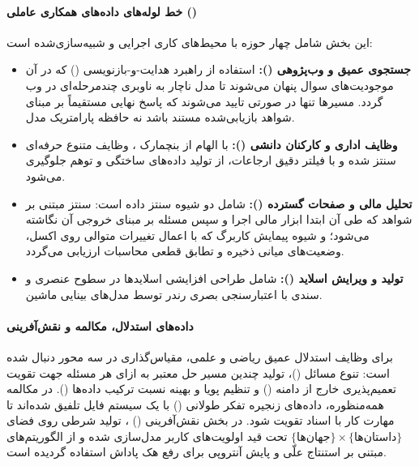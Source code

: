 \paragraph*{خط لوله‌های داده‌های همکاری عاملی ()}
این بخش شامل چهار حوزه با محیط‌های کاری اجرایی و شبیه‌سازی‌شده است:
\begin{itemize}
    \item \textbf{جستجوی عمیق و وب‌پژوهی ():} استفاده از راهبرد هدایت-و-بازنویسی () که در آن موجودیت‌های سوال پنهان می‌شوند تا مدل ناچار به ناوبری چندمرحله‌ای در وب گردد. مسیرها تنها در صورتی تایید می‌شوند که پاسخ نهایی مستقیماً بر مبنای شواهد بازیابی‌شده مستند باشد نه حافظه پارامتریک مدل.
    \item \textbf{وظایف اداری و کارکنان دانشی ():} با الهام از بنچمارک  \cite{patwardhan2025gdpval}، وظایف متنوع حرفه‌ای سنتز شده و با فیلتر دقیق ارجاعات، از تولید داده‌های ساختگی و توهم جلوگیری می‌شود.
    \item \textbf{تحلیل مالی و صفحات گسترده ():} شامل دو شیوه سنتز داده است: سنتز مبتنی بر شواهد \cite{chen2026dive} که طی آن ابتدا ابزار مالی اجرا و سپس مسئله بر مبنای خروجی آن نگاشته می‌شود؛ و شیوه پیمایش کاربرگ \cite{liu2025webexplorer} که با اعمال تغییرات متوالی روی اکسل، وضعیت‌های میانی ذخیره و تطابق قطعی محاسبات ارزیابی می‌گردد.
    \item \textbf{تولید و ویرایش اسلاید ():} شامل طراحی افزایشی اسلایدها در سطوح عنصری و سندی با اعتبارسنجی بصری رندر توسط مدل‌های بینایی ماشین.
\end{itemize}

\paragraph*{داده‌های استدلال، مکالمه و نقش‌آفرینی}
برای وظایف استدلال عمیق ریاضی و علمی، مقیاس‌گذاری در سه محور دنبال شده است: تنوع مسائل ()، تولید چندین مسیر حل معتبر به ازای هر مسئله جهت تقویت تعمیم‌پذیری خارج از دامنه () و تنظیم پویا و بهینه نسبت ترکیب داده‌ها (). در مکالمه همه‌منظوره، داده‌های زنجیره تفکر طولانی () با یک سیستم فایل تلفیق شده‌اند تا مهارت کار با اسناد تقویت شود. در بخش نقش‌آفرینی () \cite{minimax2026roleplay}، تولید شرطی روی فضای $\{\text{جهان‌ها}\} \times \{\text{داستان‌ها}\}$ تحت قید اولویت‌های کاربر مدل‌سازی شده و از الگوریتم‌های  مبتنی بر استنتاج علّی و پایش آنتروپی برای رفع هک پاداش استفاده گردیده است.

